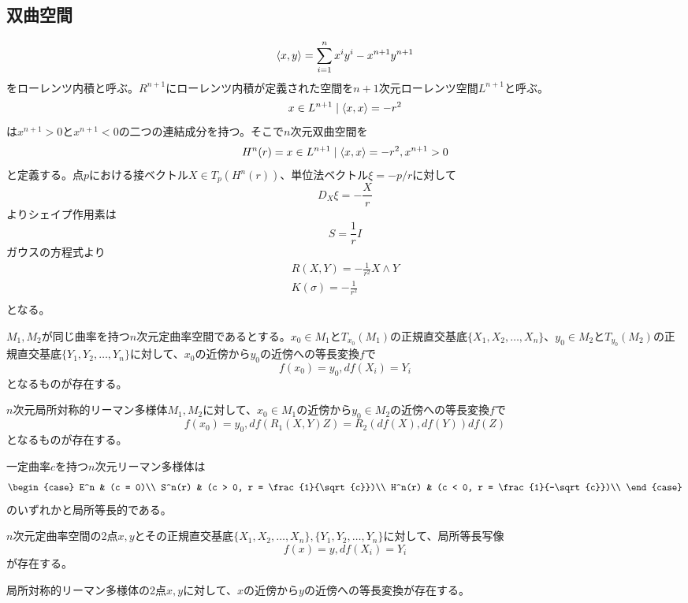     \subsection{双曲空間}
            \[\langle x, y\rangle = \sum_{i=1}^n x^iy^i - x^{n+1}y^{n+1}\]
        をローレンツ内積と呼ぶ。$R^{n+1}$にローレンツ内積が定義された空間を$n+1$次元ローレンツ空間$L^{n+1}$と呼ぶ。
            \[{x \in L^{n+1} \mid \langle x, x\rangle = -r^2}\]
        は$x^{n+1} > 0$と$x^{n+1} < 0$の二つの連結成分を持つ。そこで$n$次元双曲空間を
            \[H^n(r) = {x \in L^{n+1} \mid \langle x, x\rangle = -r^2, x^{n+1} > 0}\]
        と定義する。点$p$における接ベクトル$X \in T_p(H^n(r))$、単位法ベクトル$\xi = -p/r$に対して
            \[D_X\xi = -\frac{X}{r}\]
        よりシェイプ作用素は
            \[S = \frac{1}{r}I\]
        ガウスの方程式より
        \begin{align*}
            R(X, Y) = -\frac{1}{r^2}X \wedge Y\\
            K(\sigma) = -\frac{1}{r^2}\\
        \end{align*}
        となる。

    \begin{thm}
        $M_1, M_2$が同じ曲率を持つ$n$次元定曲率空間であるとする。$x_0 \in M_1$と$T_{x_0}(M_1)$の正規直交基底$\{X_1, X_2, \dots, X_n\}$、$y_0 \in M_2$と$T_{y_0}(M_2)$の正規直交基底$\{Y_1, Y_2, \dots, Y_n\}$に対して、$x_0$の近傍から$y_0$の近傍への等長変換$f$で
            \[f(x_0) = y_0, df(X_i) = Y_i\]
        となるものが存在する。
    \end{thm}
    \begin{thm}
        $n$次元局所対称的リーマン多様体$M_1, M_2$に対して、$x_0 \in M_1$の近傍から$y_0 \in M_2$の近傍への等長変換$f$で
            \[f(x_0) = y_0, df(R_1(X, Y)Z) = R_2(df(X), df(Y))df(Z)\]
        となるものが存在する。
    \end{thm}
    \begin{cor}
        一定曲率$c$を持つ$n$次元リーマン多様体は
        \[\begin{case}
            E^n & (c = 0)\\
            S^n(r) & (c > 0, r = \frac{1}{\sqrt{c}})\\
            H^n(r) & (c < 0, r = \frac{1}{-\sqrt{c}})\\
        \end{case}\]
        のいずれかと局所等長的である。
    \end{cor}
    \begin{cor}
        $n$次元定曲率空間の2点$x, y$とその正規直交基底$\{X_1, X_2, \dots, X_n\}, \{Y_1, Y_2, \dots, Y_n\}$に対して、局所等長写像
            \[f(x) = y, df(X_i) = Y_i\]
        が存在する。
    \end{cor}
    \begin{cor}
        局所対称的リーマン多様体の2点$x, y$に対して、$x$の近傍から$y$の近傍への等長変換が存在する。
    \end{cor}